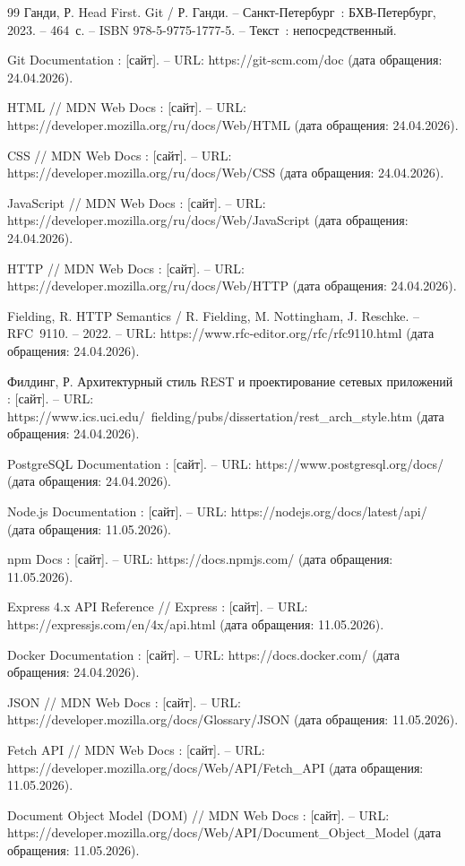 \begin{thebibliography}{99}
	Ганди, Р. Head First. Git / Р. Ганди. – Санкт-Петербург~: БХВ-Петербург, 2023. – 464~с. – ISBN 978-5-9775-1777-5. – Текст~: непосредственный.
	
	Git Documentation : [сайт]. – URL: https://git-scm.com/doc (дата обращения: 24.04.2026).
	
	HTML // MDN Web Docs : [сайт]. – URL: https://developer.mozilla.org/ru/docs/Web/HTML (дата обращения: 24.04.2026).
	
	CSS // MDN Web Docs : [сайт]. – URL: https://developer.mozilla.org/ru/docs/Web/CSS (дата обращения: 24.04.2026).
	
	JavaScript // MDN Web Docs : [сайт]. – URL: https://developer.mozilla.org/ru/docs/Web/JavaScript (дата обращения: 24.04.2026).
	
	HTTP // MDN Web Docs : [сайт]. – URL: https://developer.mozilla.org/ru/docs/Web/HTTP (дата обращения: 24.04.2026).
	
	Fielding, R. HTTP Semantics / R. Fielding, M. Nottingham, J. Reschke. – RFC~9110. – 2022. – URL: https://www.rfc-editor.org/rfc/rfc9110.html (дата обращения: 24.04.2026).
	
	Филдинг, Р. Архитектурный стиль REST и проектирование сетевых приложений : [сайт]. – URL: https://www.ics.uci.edu/~fielding/pubs/dissertation/rest\_arch\_style.htm (дата обращения: 24.04.2026).
	
	PostgreSQL Documentation : [сайт]. – URL: https://www.postgresql.org/docs/ (дата обращения: 24.04.2026).
	
	Node.js Documentation : [сайт]. – URL: https://nodejs.org/docs/latest/api/ (дата обращения: 11.05.2026).
	
	npm Docs : [сайт]. – URL: https://docs.npmjs.com/ (дата обращения: 11.05.2026).
	
	Express 4.x API Reference // Express : [сайт]. – URL: https://expressjs.com/en/4x/api.html (дата обращения: 11.05.2026).
	
	Docker Documentation : [сайт]. – URL: https://docs.docker.com/ (дата обращения: 24.04.2026).
	
	JSON // MDN Web Docs : [сайт]. – URL: https://developer.mozilla.org/docs/Glossary/JSON (дата обращения: 11.05.2026).
	
	Fetch API // MDN Web Docs : [сайт]. – URL: https://developer.mozilla.org/docs/Web/API/Fetch\_API (дата обращения: 11.05.2026).
	
	Document Object Model (DOM) // MDN Web Docs : [сайт]. – URL: https://developer.mozilla.org/docs/Web/API/Document\_Object\_Model (дата обращения: 11.05.2026).
	
\end{thebibliography}
